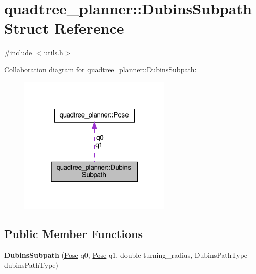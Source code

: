 \hypertarget{structquadtree__planner_1_1DubinsSubpath}{}\section{quadtree\+\_\+planner\+:\+:Dubins\+Subpath Struct Reference}
\label{structquadtree__planner_1_1DubinsSubpath}


{\ttfamily \#include $<$utils.\+h$>$}



Collaboration diagram for quadtree\+\_\+planner\+:\+:Dubins\+Subpath\+:\nopagebreak
\begin{figure}[H]
\begin{center}
\leavevmode
\includegraphics[width=208pt]{structquadtree__planner_1_1DubinsSubpath__coll__graph}
\end{center}
\end{figure}
\subsection*{Public Member Functions}
\begin{DoxyCompactItemize}
\item 
\mbox{\label{structquadtree__planner_1_1DubinsSubpath_aca184e2e5a7ddc1d699941154e4b76bb}} 
{\bfseries Dubins\+Subpath} (\hyperlink{structquadtree__planner_1_1Pose}{Pose} q0, \hyperlink{structquadtree__planner_1_1Pose}{Pose} q1, double turning\+\_\+radius, Dubins\+Path\+Type dubins\+Path\+Type)
\end{DoxyCompactItemize}
